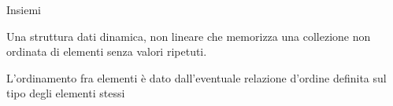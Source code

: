 \begin{frame}[shrink=5]{Insiemi}
  
\vspace{-6pt}
\begin{myboxtitle}[Insieme]
Una struttura dati \alert{dinamica}, \alert{non lineare} che memorizza una \alert{collezione non ordinata di 
elementi} senza valori ripetuti.
\BI
\item L'ordinamento fra elementi è dato dall'eventuale relazione d'ordine definita sul tipo degli elementi stessi
\EI
\end{myboxtitle}

\begin{myboxtitle}

\end{myboxtitle}

\end{frame}



